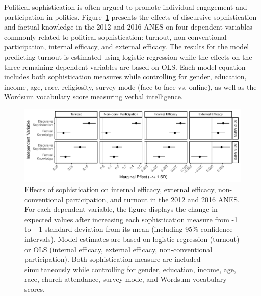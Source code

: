 \documentclass[12pt]{article}
\begin{document}
Political sophistication is often argued to promote individual engagement and participation in politics. Figure~\ref{fig:knoweff} presents the effects of discursive sophistication and factual knowledge in the 2012 and 2016 ANES on four dependent variables commonly related to political sophistication: turnout, non-conventional participation, internal efficacy, and external efficacy. The results for the model predicting turnout is estimated using logistic regression while the effects on the three remaining dependent variables are based on OLS. Each model equation includes both sophistication measures while controlling for gender, education, income, age, race, religiosity, survey mode (face-to-face vs. online), as well as the Wordsum vocabulary score measuring verbal intelligence.

\begin{figure}[h]\centering
\includegraphics{../fig/knoweff_pres.pdf}
\caption{Effects of sophistication on internal efficacy, external efficacy, non-conventional participation, and turnout in the 2012 and 2016 ANES. For each dependent variable, the figure displays the change in expected values after increasing each sophistication measure from -1 to +1 standard deviation from its mean (including 95\% confidence intervals). Model estimates are based on logistic regression (turnout) or OLS (internal efficacy, external efficacy, non-conventional participation). Both sophistication measure are included simultaneously while controlling for gender, education, income, age, race, church attendance, survey mode, and Wordsum vocabulary scores.
}\label{fig:knoweff}
\end{figure}
\end{document}
